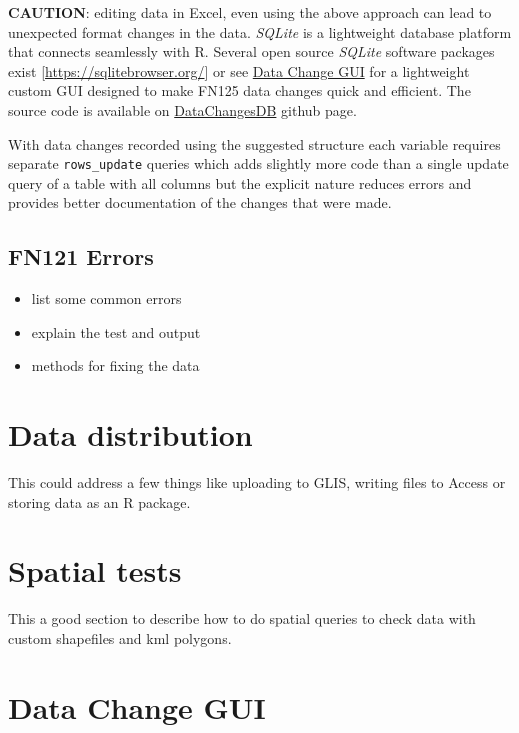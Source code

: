 \documentclass[
]{book}
\providecommand{\tightlist}{%
  \setlength{\itemsep}{0pt}\setlength{\parskip}{0pt}}
\begin{document}
\textbf{CAUTION}: editing data in Excel, even using the above approach can lead to unexpected format changes in the data. \emph{SQLite} is a lightweight database platform that connects seamlessly with R. Several open source \emph{SQLite} software packages exist {[}\url{https://sqlitebrowser.org/}{]} or see \href{Data-Change-GUI.html}{Data Change GUI} for a lightweight custom GUI designed to make FN125 data changes quick and efficient. The source code is available on \href{https://github.com/HoldenJe/DataChangesDB}{DataChangesDB} github page.

With data changes recorded using the suggested structure each variable requires separate \texttt{rows\_update} queries which adds slightly more code than a single update query of a table with all columns but the explicit nature reduces errors and provides better documentation of the changes that were made.

\hypertarget{fn121-errors}{%
\section{FN121 Errors}\label{fn121-errors}}

\begin{itemize}
\tightlist
\item
  list some common errors
\item
  explain the test and output
\item
  methods for fixing the data
\end{itemize}

\hypertarget{data-distribution}{%
\chapter{Data distribution}\label{data-distribution}}

This could address a few things like uploading to GLIS, writing files to Access or storing data as an R package.

\hypertarget{spatial-tests}{%
\chapter{Spatial tests}\label{spatial-tests}}

This a good section to describe how to do spatial queries to check data with custom shapefiles and kml polygons.

\hypertarget{data-change-gui}{%
\chapter{Data Change GUI}\label{data-change-gui}}
\end{document}
